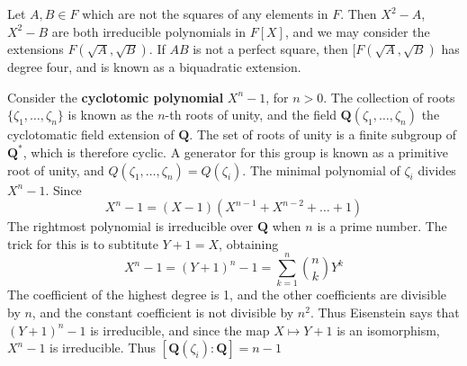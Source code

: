\begin{example}
    Let $A,B \in F$ which are not the squares of any elements in $F$. Then $X^2 - A$, $X^2 - B$ are both irreducible polynomials in $F[X]$, and we may consider the extensions $F(\sqrt{A}, \sqrt{B})$. If $AB$ is not a perfect square, then $[F(\sqrt{A}, \sqrt{B})$ has degree four, and is known as a biquadratic extension.
\end{example}

\begin{example}
    Consider the {\bf cyclotomic polynomial} $X^n - 1$, for $n > 0$. The collection of roots $\{ \zeta_1, \dots, \zeta_n \}$ is known as the $n$-th roots of unity, and the field $\mathbf{Q}(\zeta_1, \dots, \zeta_n)$ the cyclotomatic field extension of $\mathbf{Q}$. The set of roots of unity is a finite subgroup of $\mathbf{Q}^*$, which is therefore cyclic. A generator for this group is known as a primitive root of unity, and $Q(\zeta_1, \dots, \zeta_n) = Q(\zeta_i)$. The minimal polynomial of $\zeta_i$ divides $X^n - 1$. Since
    \[ X^n - 1 = (X - 1)(X^{n-1} + X^{n-2} + \dots + 1) \]
    The rightmost polynomial is irreducible over $\mathbf{Q}$ when $n$ is a prime number. The trick for this is to subtitute $Y+1 = X$, obtaining
    \[ X^n - 1 = (Y+1)^n - 1 = \sum_{k = 1}^n \binom{n}{k} Y^k \]
    The coefficient of the highest degree is 1, and the other coefficients are divisible by $n$, and the constant coefficient is not divisible by $n^2$. Thus Eisenstein says that $(Y + 1)^n - 1$ is irreducible, and since the map $X \mapsto Y + 1$ is an isomorphism, $X^n - 1$ is irreducible. Thus $[\mathbf{Q}(\zeta_i): \mathbf{Q}] = n - 1$
\end{example}